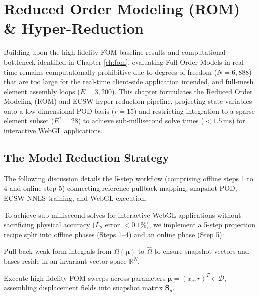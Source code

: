 \chapter{Reduced Order Modeling (ROM) \& Hyper-Reduction}
\label{ch:rom}


Building upon the high-fidelity FOM baseline results and computational bottleneck identified in Chapter \ref{ch:fom}, evaluating Full Order Models in real time remains computationally prohibitive due to degrees of freedom ($N = 6,888$) that are too large for the real-time client-side application intended, and full-mesh element assembly loops ($E = 3,200$). This chapter formulates the Reduced Order Modeling (ROM) and ECSW hyper-reduction pipeline, projecting state variables onto a low-dimensional POD basis ($r = 15$) and restricting integration to a sparse element subset ($E^* = 28$) to achieve sub-millisecond solve times ($<1.5\,\text{ms}$) for interactive WebGL applications.

\section{The Model Reduction Strategy}

The following discussion details the 5-step workflow (comprising offline steps 1 to 4 and online step 5) connecting reference pullback mapping, snapshot POD, ECSW NNLS training, and WebGL execution.

To achieve sub-millisecond solves for interactive WebGL applications without sacrificing physical accuracy ($L_2$ error $<0.1\%$), we implement a 5-step projection recipe split into offline phases (Steps 1--4) and an online phase (Step 5):

\begin{tcolorbox}[colback=lightbg, colframe=primaryblue, title={\textbf{Step 1: Pullback Mapping to Reference Domain $\hat{\Omega}$ (Offline)}}, fonttitle=\bfseries]
    Pull back weak form integrals from $\Omega(\boldsymbol{\mu})$ to $\hat{\Omega}$ to ensure snapshot vectors and bases reside in an invariant vector space $\mathbb{R}^N$.
\end{tcolorbox}

\begin{tcolorbox}[colback=lightbg, colframe=primaryblue, title={\textbf{Step 2: Snapshot Collection \& Data Generation (Offline)}}, fonttitle=\bfseries]
    Execute high-fidelity FOM sweeps across parameters $\boldsymbol{\mu} = (x_c, r)^T \in \mathcal{D}$, assembling displacement fields into snapshot matrix $\mathbf{S}_u$.
\end{tcolorbox}


